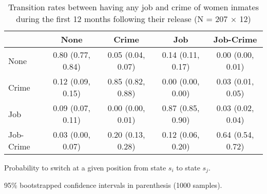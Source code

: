 \begin{table}[htp]
\scriptsize
\setlength{\tabcolsep}{10pt}
\renewcommand{\arraystretch}{1.3}
\begin{threeparttable}
\centering
\caption{Transition rates between having any job and crime of women inmates \newline
    during the first 12 months following their release (N = 207 $\times$ 12)} 
\label{tab:transition_rates_anyjob_crime}
\begin{tabular}{lcccc}
  \hline
 & None & Crime & Job & Job-Crime \\ 
  \hline
None & 0.80 (0.77, 0.84) & 0.05 (0.04, 0.07) & 0.14 (0.11, 0.17) & 0.00 (0.00, 0.01) \\ 
  Crime & 0.12 (0.09, 0.15) & 0.85 (0.82, 0.88) & 0.00 (0.00, 0.00) & 0.03 (0.01, 0.05) \\ 
  Job & 0.09 (0.07, 0.11) & 0.00 (0.00, 0.01) & 0.87 (0.85, 0.90) & 0.03 (0.02, 0.04) \\ 
  Job-Crime & 0.03 (0.00, 0.07) & 0.20 (0.13, 0.28) & 0.12 (0.06, 0.20) & 0.64 (0.54, 0.72) \\ 
   \hline
\end{tabular}
\begin{tablenotes}
\scriptsize
\item Probability to switch at a given position from state $s_i$ to state $s_j$. 
    \item 95\% bootstrapped confidence intervals in parenthesis (1000 samples).
\end{tablenotes}
\end{threeparttable}
\end{table}
